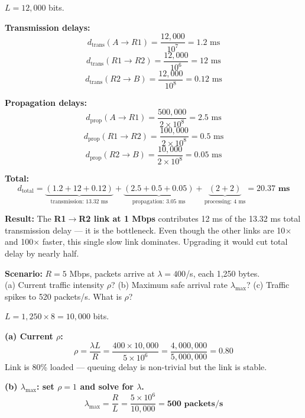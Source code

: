 \documentclass[11pt, letterpaper]{article}
\begin{document}
$L = 12{,}000$ bits.

\textbf{Transmission delays:}
\[d_{\text{trans}}(A\to R1) = \frac{12{,}000}{10^7} = 1.2\text{ ms}\]
\[d_{\text{trans}}(R1\to R2) = \frac{12{,}000}{10^6} = 12\text{ ms}\]
\[d_{\text{trans}}(R2\to B) = \frac{12{,}000}{10^8} = 0.12\text{ ms}\]

\textbf{Propagation delays:}
\[d_{\text{prop}}(A\to R1) = \frac{500{,}000}{2\times10^8} = 2.5\text{ ms}\]
\[d_{\text{prop}}(R1\to R2) = \frac{100{,}000}{2\times10^8} = 0.5\text{ ms}\]
\[d_{\text{prop}}(R2\to B) = \frac{10{,}000}{2\times10^8} = 0.05\text{ ms}\]

\textbf{Total:}
\[d_{\text{total}} = \underbrace{(1.2 + 12 + 0.12)}_{\text{transmission: 13.32 ms}}
 + \underbrace{(2.5 + 0.5 + 0.05)}_{\text{propagation: 3.05 ms}}
 + \underbrace{(2 + 2)}_{\text{processing: 4 ms}} = \mathbf{20.37\text{ ms}}\]

\begin{tcolorbox}[colback=part4bg, colframe=sectionorange, arc=3pt, boxrule=1pt]
\textbf{Result:} The \textbf{R1$\to$R2 link at 1 Mbps} contributes 12 ms of the 13.32 ms
total transmission delay --- it is the bottleneck. Even though the other links are 10$\times$
and 100$\times$ faster, this single slow link dominates. Upgrading it would cut total delay by
nearly half.
\end{tcolorbox}

\vspace{8pt}

\begin{tcolorbox}[colback=part4bg, colframe=sectionorange,
  title={\bfseries Problem A5 --- Traffic Intensity: Is This Link Going to Collapse?}, arc=3pt, boxrule=1pt]
\textbf{Scenario:} $R = 5$ Mbps, packets arrive at $\lambda = 400$/s, each 1{,}250 bytes.\\
(a) Current traffic intensity $\rho$?\quad
(b) Maximum safe arrival rate $\lambda_{\max}$?\quad
(c) Traffic spikes to 520 packets/s. What is $\rho$?
\end{tcolorbox}

$L = 1{,}250 \times 8 = 10{,}000$ bits.

\textbf{(a) Current $\rho$:}
\[\rho = \frac{\lambda L}{R} = \frac{400 \times 10{,}000}{5 \times 10^6}
  = \frac{4{,}000{,}000}{5{,}000{,}000} = \mathbf{0.80}\]
Link is 80\% loaded --- queuing delay is non-trivial but the link is stable.

\textbf{(b) $\lambda_{\max}$: set $\rho = 1$ and solve for $\lambda$.}
\[\lambda_{\max} = \frac{R}{L} = \frac{5 \times 10^6}{10{,}000} = \mathbf{500 \text{ packets/s}}\]
\end{document}
